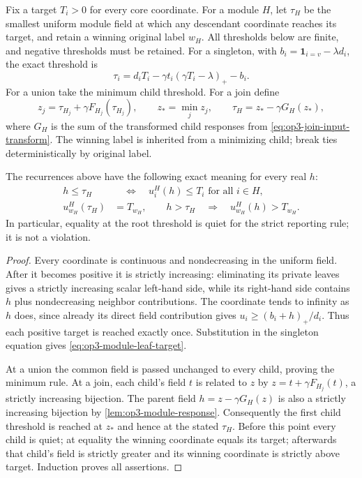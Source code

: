 Fix a target $T_i>0$ for every core coordinate. For a module $H$, let
$\tau_H$ be the smallest uniform module field at which any descendant
coordinate reaches its target, and retain a winning original label $w_H$.
All thresholds below are finite, and negative thresholds must be retained.
For a singleton, with $b_i=\mathbf1_{i=v}-\lambda d_i$, the exact threshold is
\begin{equation}
 \tau_i=d_iT_i-\gamma t_i(\gamma T_i-\lambda)_+-b_i.
 \label{eq:op3-module-leaf-target}
\end{equation}
For a union take the minimum child threshold. For a join define
\begin{equation}
 z_j=\tau_{H_j}+\gamma F_{H_j}(\tau_{H_j}),\qquad
 z_* = \min_j z_j,\qquad
 \tau_H=z_*-\gamma G_H(z_*),
 \label{eq:op3-module-parent-target}
\end{equation}
where $G_H$ is the sum of the transformed child responses from
\cref{eq:op3-join-input-transform}. The winning label is inherited from
a minimizing child; break ties deterministically by original label.

\begin{lemma}
\label{lem:op3-module-target-certificate}
The recurrences above have the following exact meaning for every real $h$:
\begin{align*}
 h\leq\tau_H&\quad\Longleftrightarrow\quad
 u_i^H(h)\leq T_i\text{ for all }i\in H,\\
 u_{w_H}^H(\tau_H)&=T_{w_H},\qquad
 h>\tau_H\quad\Longrightarrow\quad u_{w_H}^H(h)>T_{w_H}.
\end{align*}
In particular, equality at the root threshold is quiet for the strict
reporting rule; it is not a violation.
\end{lemma}
\begin{proof}
Every coordinate is continuous and nondecreasing in the uniform field.
After it becomes positive it is strictly increasing: eliminating its
private leaves gives a strictly increasing scalar left-hand side, while
its right-hand side contains $h$ plus nondecreasing neighbor contributions.
The coordinate tends to infinity as $h$ does, since already its direct
field contribution gives $u_i\geq (b_i+h)_+/d_i$.
Thus each positive target is reached exactly once. Substitution in the
singleton equation gives \cref{eq:op3-module-leaf-target}.

At a union the common field is passed unchanged to every child, proving
the minimum rule. At a join, each child's field $t$ is related to $z$ by
$z=t+\gamma F_{H_j}(t)$, a strictly increasing bijection. The parent field
$h=z-\gamma G_H(z)$ is also a strictly increasing bijection by
\cref{lem:op3-module-response}. Consequently the first child threshold
is reached at $z_*$ and hence at the stated $\tau_H$. Before this point
every child is quiet; at equality the winning coordinate equals its
target; afterwards that child's field is strictly greater and its winning
coordinate is strictly above target. Induction proves all assertions.
\end{proof}

